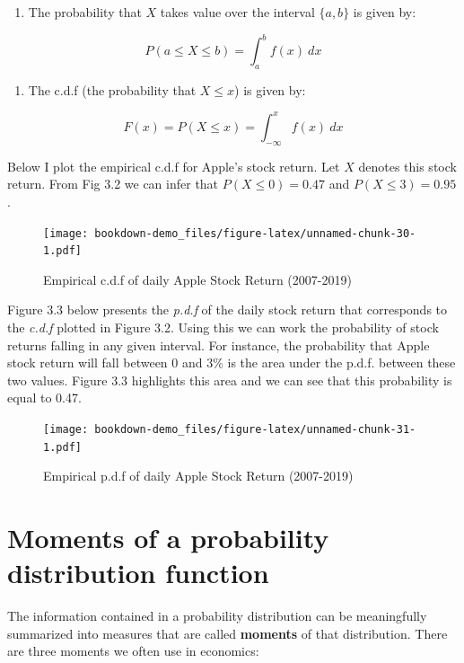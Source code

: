 \documentclass[
]{book}
\providecommand{\tightlist}{%
  \setlength{\itemsep}{0pt}\setlength{\parskip}{0pt}}
\theoremstyle{definition}
\theoremstyle{definition}
\theoremstyle{definition}
\theoremstyle{definition}
\theoremstyle{remark}
\begin{document}
\begin{enumerate}
\def\labelenumi{\arabic{enumi}.}
\tightlist
\item
  The probability that \(X\) takes value over the interval \(\{a,b\}\) is given by:
\end{enumerate}

\[P(a\leq X \leq b)=\int_a^bf(x) \ dx\]

\begin{enumerate}
\def\labelenumi{\arabic{enumi}.}
\setcounter{enumi}{1}
\tightlist
\item
  The c.d.f (the probability that \(X\leq x\)) is given by:
\end{enumerate}

\[F(x)=P(X\leq x)=\int_{-\infty}^xf(x) \ dx\]

Below I plot the empirical c.d.f for Apple's stock return. Let \(X\) denotes this stock return. From Fig 3.2 we can infer that \(P(X\leq 0)=0.47\) and \(P(X\leq 3)=0.95\).

\begin{figure}
\centering
\texttt{[image: bookdown-demo\_files/figure-latex/unnamed-chunk-30-1.pdf]}
\caption{\label{fig:unnamed-chunk-30}Empirical c.d.f of daily Apple Stock Return (2007-2019)}
\end{figure}

Figure 3.3 below presents the \emph{p.d.f} of the daily stock return that corresponds to the \emph{c.d.f} plotted in Figure 3.2. Using this we can work the probability of stock returns falling in any given interval. For instance, the probability that Apple stock return will fall between 0 and 3\% is the area under the p.d.f. between these two values. Figure 3.3 highlights this area and we can see that this probability is equal to 0.47.

\begin{figure}
\centering
\texttt{[image: bookdown-demo\_files/figure-latex/unnamed-chunk-31-1.pdf]}
\caption{\label{fig:unnamed-chunk-31}Empirical p.d.f of daily Apple Stock Return (2007-2019)}
\end{figure}

\hypertarget{moments-of-a-probability-distribution-function}{%
\section{Moments of a probability distribution function}\label{moments-of-a-probability-distribution-function}}

The information contained in a probability distribution can be meaningfully summarized into measures that are called \textbf{moments} of that distribution. There are three moments we often use in economics:
\end{document}
